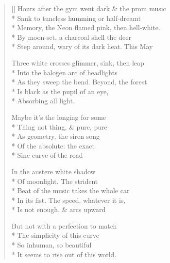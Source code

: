 \label{ch:y_sin_x}
\settowidth{\versewidth}{Hours after the gym went dark \& the prom music}
\begin{verse}[\versewidth]
Hours after the gym went dark \& the prom music\\*
Sank to tuneless humming or half-dreamt\\*
Memory, the Neon flamed pink, then hell-white.\\*
By moon-set, a charcoal shell the deer\\*
Step around, wary of its dark heat.  This May

Three white crosses glimmer, sink, then leap\\*
Into the halogen arc of headlights\\*
As they sweep the bend. Beyond, the forest\\*
Is black as the pupil of an eye, \\*
Absorbing all light.

Maybe it's the longing for some\\*
Thing not thing, \& pure, pure\\*
As geometry, the siren song\\*
Of the absolute: the exact\\*
Sine curve of the road

In the austere white shadow\\*
Of moonlight.  The strident\\*
Beat of the music takes the whole car\\*
In its fist.  The speed, whatever it is,\\*
Is not enough, \& arcs upward

But not with a perfection to match\\*
The simplicity of this curve\\*
So inhuman, so beautiful\\*
It seems to rise out of this world.
\end{verse}
